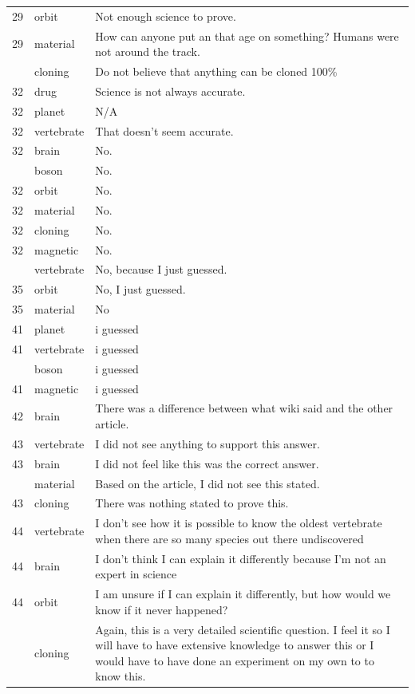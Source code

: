 \documentclass[
  doc,floatsintext]{apa6}
\begin{document}
\begin{longtable}[t]{>{}r>{}l>{\raggedright\arraybackslash}p{30em}}
29 & orbit & Not enough science to prove.\\
29 & material & How can anyone put an  that age on something? Humans were not around the track.\\
\addlinespace
29 & cloning & Do not believe that anything can be cloned 100\%\\
32 & drug & Science is not always accurate.\\
32 & planet & N/A\\
32 & vertebrate & That doesn't seem accurate.\\
32 & brain & No.\\
\addlinespace
32 & boson & No.\\
32 & orbit & No.\\
32 & material & No.\\
32 & cloning & No.\\
32 & magnetic & No.\\
\addlinespace
35 & vertebrate & No, because I just guessed.\\
35 & orbit & No, I just guessed.\\
35 & material & No\\
41 & planet & i guessed\\
41 & vertebrate & i guessed\\
\addlinespace
41 & boson & i guessed\\
41 & magnetic & i guessed\\
42 & brain & There was a difference between what wiki said and the other article.\\
43 & vertebrate & I did not see anything to support this answer.\\
43 & brain & I did not feel like this was the correct answer.\\
\addlinespace
43 & material & Based on the article, I did not see this stated.\\
43 & cloning & There was nothing stated to prove this.\\
44 & vertebrate & I don’t see how it is possible to know the oldest vertebrate when there are so many species out there undiscovered\\
44 & brain & I don’t think I can explain it differently because I’m not an expert in science\\
44 & orbit & I am unsure if I can explain it differently, but how would we know if it never happened?\\
\addlinespace
44 & cloning & Again, this is a very detailed scientific question. I feel it so I will have to have extensive knowledge to answer this or I would have to have done an experiment on my own to to know this.\\

\end{longtable}
\end{document}

